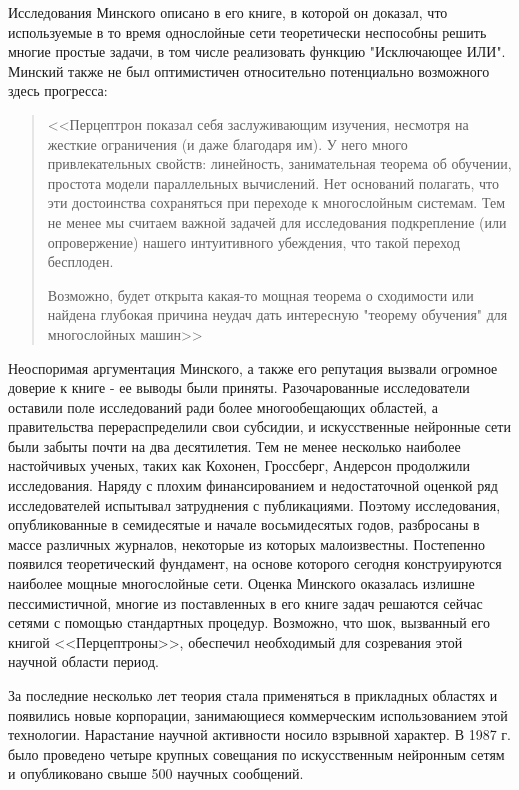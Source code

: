 \documentclass[a4paper,12pt]{report}
\begin{document}
Исследования Минского описано в его книге, в которой он доказал, что используемые в то время однослойные сети теоретически неспособны решить многие простые задачи, в том числе реализовать функцию "Исключающее ИЛИ". Минский также не был оптимистичен относительно потенциально возможного здесь прогресса: 
\begin{quote}
<<Перцептрон показал себя заслуживающим изучения, несмотря на жесткие ограничения (и даже благодаря им). У него много привлекательных свойств: линейность, занимательная теорема об обучении, простота модели параллельных вычислений. Нет оснований полагать, что эти достоинства сохраняться при переходе к многослойным системам. Тем не менее мы считаем важной задачей для исследования подкрепление (или опровержение) нашего интуитивного убеждения, что такой переход бесплоден.

Возможно, будет открыта какая-то мощная теорема о сходимости или найдена глубокая причина неудач дать интересную "теорему обучения" для многослойных машин>>\cite{minsky}
\end{quote}

Неоспоримая аргументация Минского, а также его репутация вызвали огромное доверие к книге - ее выводы были приняты. Разочарованные исследователи оставили поле исследований ради более многообещающих областей, а правительства перераспределили свои субсидии, и искусственные нейронные сети были забыты почти на два десятилетия. Тем не менее несколько наиболее настойчивых ученых, таких как Кохонен, Гроссберг, Андерсон продолжили исследования. Наряду с плохим финансированием и недостаточной оценкой ряд исследователей испытывал затруднения с публикациями. Поэтому исследования, опубликованные в семидесятые и начале восьмидесятых годов, разбросаны в массе различных журналов, некоторые из которых малоизвестны. Постепенно появился теоретический фундамент, на основе которого сегодня конструируются наиболее мощные многослойные сети. Оценка Минского оказалась излишне пессимистичной, многие из поставленных в его книге задач решаются сейчас сетями с помощью стандартных процедур. Возможно, что шок, вызванный его книгой <<Перцептроны>>, 
обеспечил необходимый для созревания этой научной области период. 

За последние несколько лет теория стала применяться в прикладных областях и появились новые корпорации, занимающиеся коммерческим использованием этой технологии. Нарастание научной активности носило взрывной характер. В 1987 г. было проведено четыре крупных совещания по искусственным нейронным сетям и опубликовано свыше 500 научных сообщений.  
\end{document}
